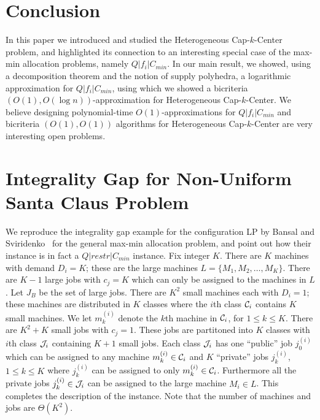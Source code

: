 \documentclass{llncs}
\def\mckc{{{\sffamily Heterogeneous Cap-$k$-Center}}\xspace}
\def\cckp{$Q|f_i|C_{min}$\xspace}
\begin{document}
\section{Conclusion}
In this paper we introduced and studied the \mckc problem, and highlighted its connection to an interesting special case of the max-min allocation problems, namely \cckp. In our main result, we showed, using a decomposition theorem and the notion of supply polyhedra, a logarithmic approximation for \cckp, using which we showed a bicriteria $(O(1),O(\log n))$-approximation for \mckc. We believe designing polynomial-time $O(1)$-approximations for \cckp and bicriteria $(O(1),O(1))$ algorithms for \mckc are very interesting open problems.



%


\newpage
\appendix



%











\section{Integrality Gap for Non-Uniform Santa Claus Problem}\label{sec:app-bsig}
We reproduce the integrality gap example for the configuration LP by Bansal and Sviridenko~\cite{BansalS06} for the general max-min allocation problem, and point out how their instance is in fact a $Q|restr|C_{min}$ instance.
Fix integer $K$. There are $K$ machines with demand $D_i = K$; these are the large machines $L = \{M_1,M_2,\ldots,M_K\}$. There are $K-1$ large jobs with $c_j = K$ which can only be assigned to the machines in $L$.
Let $J_B$ be the set of large jobs. There are $K^2$ small machines each with $D_i = 1$; these machines are distributed in $K$ classes where the $i$th class ${\cal C}_i$ contains $K$ small machines. We let $m^{(i)}_k$ denote the $k$th machine in ${\cal C}_i$, for $1\leq k\leq K$.
There are $K^2 + K$ small jobs with $c_j = 1$. These jobs are partitoned into $K$ classes with $i$th class ${\cal J}_i$ containing $K+1$ small jobs. Each class ${\cal J}_i$ has one ``public'' job $j^{(i)}_0$ which can be assigned to any machine $m^{(i)}_k \in {\cal C}_i$
 and $K$ ``private'' jobs $j^{(i)}_k$, $1\leq k\leq K$ where $j^{(i)}_k$ can be assigned to only $m^{(i)}_k \in {\cal C}_i$. Furthermore all the private jobs $j^{(i)}_k\in {\cal J}_i$ can be assigned to the large machine $M_i \in L$. This completes the description of the instance.
Note that the number of machines and jobs are $\Theta(K^2)$.
\end{document}
